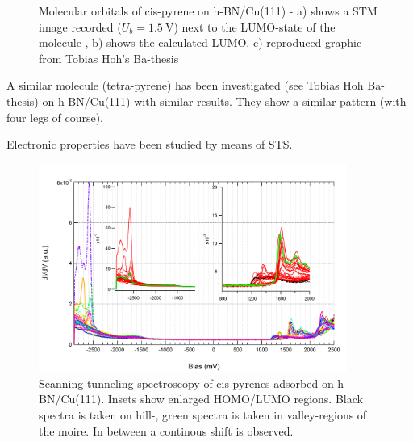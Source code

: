 \begin{figure}[!h]
\centering
\caption{Molecular orbitals of cis-pyrene on h-BN/Cu(111) - a) shows a STM image recorded ($U_b=\SI{1.5}{\V}$) next to the LUMO-state of the molecule , b) shows the calculated LUMO. c) reproduced graphic from Tobias Hoh's Ba-thesis} 
\label{fig:cis-orbital}
\end{figure}
A similar molecule (tetra-pyrene) has been investigated (see Tobias Hoh Ba-thesis) on h-BN/Cu(111) with similar results. They show a similar pattern (with four legs of course). 

Electronic properties have been studied by means of STS.

\begin{figure}[!h]
\centering
 \includegraphics[width=0.9\textwidth]{./images/spectra-in-moire.png}
 \caption{Scanning tunneling spectroscopy of cis-pyrenes adsorbed on h-BN/Cu(111). Insets show enlarged HOMO/LUMO regions. Black spectra is taken on  hill-, green spectra is taken in valley-regions of the moire. In between a continous shift is observed.} 
\label{fig:cis-orbital}
\end{figure}


